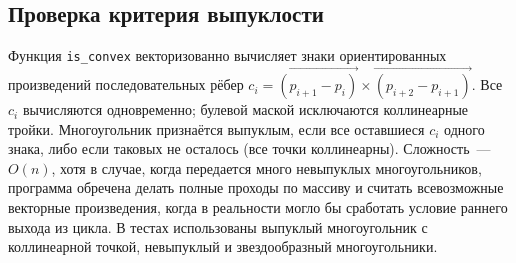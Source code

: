 


\subsection{Проверка критерия выпуклости}

Функция \texttt{is\_convex} векторизованно вычисляет знаки
ориентированных произведений последовательных рёбер
$c_i = \overrightarrow{(p_{i+1}-p_i)} \times
\overrightarrow{(p_{i+2}-p_{i+1})}$.
Все $c_i$ вычисляются одновременно; булевой маской исключаются
коллинеарные тройки. Многоугольник признаётся выпуклым,
если все оставшиеся $c_i$ одного знака, либо если таковых не осталось
(все точки коллинеарны). Сложность~--- $O(n)$, хотя в случае, когда
передается много невыпуклых многоугольников, программа обречена
делать полные проходы по массиву и считать всевозможные векторные
произведения, когда в реальности могло бы сработать условие раннего выхода из цикла. В тестах
использованы
выпуклый многоугольник с коллинеарной точкой, невыпуклый и звездообразный многоугольники.

\newpage
 

